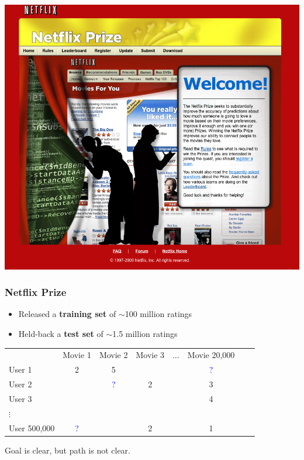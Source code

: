 \documentclass[aspectratio=169]{beamer}
\begin{document}
\begin{frame}

\begin{center}
\includegraphics[height=0.8\textheight]{figures/netflix_prize}
\end{center}

\end{frame}
\begin{frame}
\frametitle{Netflix Prize}

\begin{itemize}
\item Released a \textbf{training set} of $\sim$100 million ratings
\item Held-back a \textbf{test set} of $\sim$1.5 million ratings
\end{itemize}
\small{
\begin{tabular}{lccccccc}
           & Movie 1 & Movie 2  & Movie 3  & $\hdots$ &Movie 20,000 \\
User 1 & 2 & 5 &  & & \textcolor{blue}{?} \\
User 2 &  & \textcolor{blue}{?}  & 2  & & 3 \\
User 3 &  &  & & & 4 \\
$\vdots$ & & & & & &\\
User 500,000  & \textcolor{blue}{?} & & 2 &  & 1\\
\end{tabular}
}

\vfill
Goal is clear, but path is not clear.

\end{frame}
\end{document}
